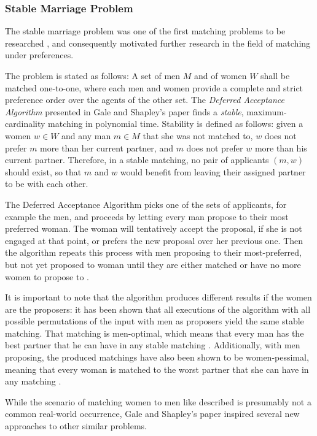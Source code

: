 \subsubsection{Stable Marriage Problem}\label{intro:stable-marriage}
The stable marriage problem was one of the first matching problems to be researched \cite{GaleShapleyOrig}, and consequently motivated further research in the field of matching under preferences.

The problem is stated as follows: A set of men $M$ and of women $W$ shall be matched one-to-one, where each men and women provide a complete and strict preference order over the agents of the other set. The \emph{Deferred Acceptance Algorithm} presented in Gale and Shapley's paper \cite{GaleShapleyOrig} finds a \emph{stable}, maximum-cardinality matching in polynomial time. Stability is defined as follows: given a women $w \in W$ and any man $m \in M$ that she was not matched to, $w$ does not prefer $m$ more than her current partner, and $m$ does not prefer $w$ more than his current partner. Therefore, in a stable matching, no pair of applicants $(m, w)$ should exist, so that $m$ and $w$ would benefit from leaving their assigned partner to be with each other.

The Deferred Acceptance Algorithm picks one of the sets of applicants, for example the men, and proceeds by letting every man propose to their most preferred woman. The woman will tentatively accept the proposal, if she is not engaged at that point, or prefers the new proposal over her previous one. Then the algorithm repeats this process with men proposing to their most-preferred, but not yet proposed to woman until they are either matched or have no more women to propose to \cite{Gusfield}.

It is important to note that the algorithm produces different results if the women are the proposers: it has been shown that all executions of the algorithm with all possible permutations of the input with men as proposers yield the same stable matching. That matching is men-optimal, which means that every man has the best partner that he can have in any stable matching \cite{Gusfield}. Additionally, with men proposing, the produced matchings have also been shown to be women-pessimal, meaning that every woman is matched to the worst partner that she can have in any matching \cite{Gusfield}.

While the scenario of matching women to men like described is presumably not a common real-world occurrence, Gale and Shapley's paper inspired several new approaches to other similar problems.

